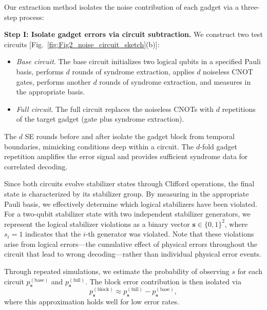 \documentclass[aps, prx, reprint, superscriptaddress, longbibliography, floatfix]{revtex4-2}
\begin{document}
Our extraction method isolates the noise contribution of each gadget via a three-step process:

\textbf{Step I: Isolate gadget errors via circuit subtraction.} We construct two test circuits [Fig.~\ref{fig:Fig2_noise_circuit_sketch}(b)]: 
\begin{itemize}
    \item \textit{Base circuit}. The base circuit initializes two logical qubits in a specified Pauli basis, performs $d$ rounds of syndrome extraction, applies $d$ noiseless CNOT gates, performs another $d$ rounds of syndrome extraction, and measures in the appropriate basis.
    \item \textit{Full circuit}. The full circuit replaces the noiseless CNOTs with $d$ repetitions of the target gadget (gate plus syndrome extraction).
\end{itemize}
The $d$ SE rounds before and after isolate the gadget block from temporal boundaries, mimicking conditions deep within a circuit. The $d$-fold gadget repetition amplifies the error signal and provides sufficient syndrome data for correlated decoding.

Since both circuits evolve stabilizer states through Clifford operations, the final state is characterized by its stabilizer group. By measuring in the appropriate Pauli basis, we effectively determine which logical stabilizers have been violated. For a two-qubit stabilizer state with two independent stabilizer generators, we represent the logical stabilizer violations as a binary vector $\textbf{s} \in \{0,1\}^2$, where $s_i=1$ indicates that the $i$-th generator was violated. Note that these violations arise from logical errors—the cumulative effect of physical errors throughout the circuit that lead to wrong decoding—rather than individual physical error events.

Through repeated simulations, we estimate the probability of observing $s$ for each circuit $p^{(\text{base})}_{\mathbf{s}}$ and $p^{(\text{full})}_{\mathbf{s}}$. The block error contribution is then isolated via 
\begin{equation}
     p^{(\text{block})}_{\mathbf{s}}  \approx p^{(\text{full})}_{\mathbf{s}} - p^{(\text{base})}_{\mathbf{s}},
\end{equation}
where this approximation holds well for low error rates.
\end{document}
